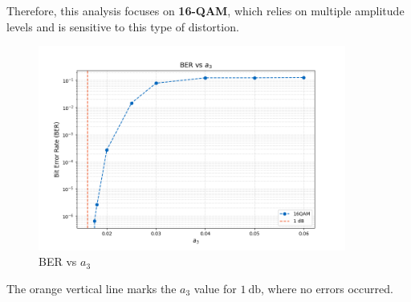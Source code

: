Therefore, this analysis focuses on \textbf{16-QAM}, which relies on multiple amplitude levels and is sensitive to this type of distortion.

\begin{figure}[H]
    \centering
    \includegraphics*[width=0.9\textwidth]{Images/BER_a3.png}
    \caption{BER vs $a_3$}
    \label{fig:BER_a3}
\end{figure}

The orange vertical line marks the $a_3$ value for $\SI{1}{\decibel}$, where no errors occurred.

